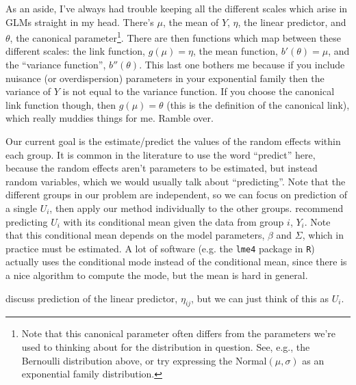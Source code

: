 \documentclass{article}
\begin{document}
As an aside, I've always had trouble keeping all the different scales which arise in GLMs straight in my head. There's $\mu$, the mean of $Y$, $\eta$, the linear predictor, and $\theta$, the canonical parameter\footnote{Note that this canonical parameter often differs from the parameters we're used to thinking about for the distribution in question. See, e.g., the Bernoulli distribution above, or try expressing the Normal$(\mu, \sigma)$ as an exponential family distribution.}. There are then functions which map between these different scales: the link function, $g(\mu) = \eta$, the mean function, $b'(\theta) = \mu$, and the ``variance function'', $b''(\theta)$. This last one bothers me because if you include nuisance (or overdispersion) parameters in your exponential family then the variance of $Y$ is not equal to the variance function. If you choose the canonical link function though, then $g(\mu) = \theta$ (this is the definition of the canonical link), which really muddies things for me. Ramble over.

Our current goal is the estimate/predict the values of the random effects within each group. It is common in the literature to use the word ``predict'' here, because the random effects aren't parameters to be estimated, but instead random variables, which we would usually talk about ``predicting''. Note that the different groups in our problem are independent, so we can focus on prediction of a single $U_i$, then apply our method individually to the other groups. \citeauthor{Boo98} recommend predicting $U_i$ with its conditional mean given the data from group $i$, $Y_i$. Note that this conditional mean depends on the model parameters, $\beta$ and $\Sigma$, which in practice must be estimated. A lot of software (e.g. the \texttt{lme4} package in \texttt{R}) actually uses the conditional mode instead of the conditional mean, since there is a nice algorithm to compute the mode, but the mean is hard in general.

\citeauthor{Boo98} discuss prediction of the linear predictor, $\eta_{ij}$, but we can just think of this as $U_i$.







\end{document}
